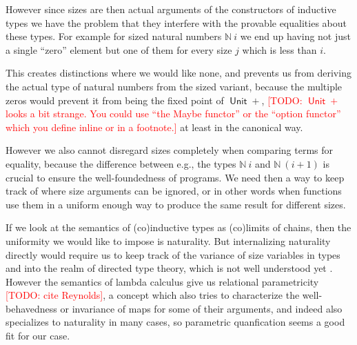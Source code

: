 \documentclass{book}
\newcommand{\TODO}[1]{\textcolor{red}{[TODO: #1]}}
\DeclareMathOperator{\Unit}{\mathsf{Unit}}
\newcommand{\sNat}{\mathbb{N}}
\begin{document}
However since sizes are then actual arguments of the constructors of
inductive types we have the problem that they interfere with the
provable equalities about these types. For example for sized natural
numbers $\sNat~i$ we end up having not just a single ``zero'' element
but one of them for every size $j$ which is less than $i$.

This creates distinctions where we would like none, and prevents us
from deriving the actual type of natural numbers from the sized
variant, because the multiple zeros would prevent it from being the
fixed point of $\Unit +$,
\TODO{$\Unit +$ looks a bit strange.  You could use
``the Maybe functor'' or the ``option functor'' which you define
inline or in a footnote.}
at least in the canonical way.

However we also cannot disregard sizes completely when comparing terms
for equality, because the difference between e.g., the types $\sNat~i$ and
$\sNat~(i+1)$ is crucial to ensure the well-foundedness of programs.
We need then a way to keep track of where size arguments can be
ignored, or in other words when functions use them in a uniform enough
way to produce the same result for different sizes.

If we look at the semantics of (co)inductive types as (co)limits of
chains, then the uniformity we would like to impose is naturality. But
internalizing naturality directly would require us to keep track of
the variance of size variables in types and into the realm of directed
type theory, which is not well understood yet \cite{Harper-Licata,
  Shulman}. However the semantics of lambda calculus give us
relational parametricity \TODO{cite Reynolds}, a concept which also
tries to characterize the well-behavedness or invariance of maps for
some of their arguments, and indeed also specializes to naturality in
many cases, so parametric quanfication seems a good fit for our
case.
\end{document}
